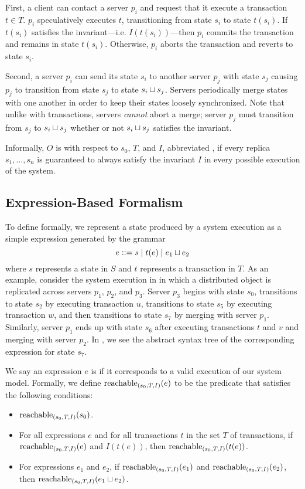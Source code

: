 First, a client can contact a server $p_i$ and request that it execute a
transaction $t \in T$. $p_i$ speculatively executes $t$, transitioning from
state $s_i$ to state $t(s_i)$. If $t(s_i)$ satisfies the invariant---i.e.
$I(t(s_i))$---then $p_i$ commits the transaction and remains in state $t(s_i)$.
Otherwise, $p_i$ aborts the transaction and reverts to state $s_i$.

Second, a server $p_i$ can send its state $s_i$ to another server $p_j$ with
state $s_j$ causing $p_j$ to transition from state $s_j$ to state $s_i \sqcup
s_j$. Servers periodically merge states with one another in order to keep their
states loosely synchronized. Note that unlike with transactions, servers
\emph{cannot} abort a merge; server $p_j$ must transition from $s_j$ to $s_i
\sqcup s_j$ whether or not $s_i \sqcup s_j$ satisfies the invariant.

Informally, $O$ is  with respect to $s_0$, $T$,
and $I$, abbreviated , if every replica $s_1, \ldots,
s_n$ is guaranteed to always satisfy the invariant $I$ in every possible
execution of the system.

\subsection{Expression-Based Formalism}
To define \invariantconfluence{} formally, we represent a state produced by a
system execution as a simple expression generated by the grammar
\[
  e ::= s \mid t(e) \mid e_1 \sqcup e_2
\]
where $s$ represents a state in $S$ and $t$ represents a transaction in $T$. As
an example, consider the system execution in  in which
a distributed object is replicated across servers $p_1$, $p_2$, and $p_3$.
Server $p_3$ begins with state $s_0$, transitions to state $s_2$ by executing
transaction $u$, transitions to state $s_5$ by executing transaction $w$, and
then transitions to state $s_7$ by merging with server $p_1$. Similarly, server
$p_1$ ends up with state $s_6$ after executing transactions $t$ and $v$ and
merging with server $p_2$. In , we see the abstract syntax
tree of the corresponding expression for state $s_7$.

{}

We say an expression $e$ is  if it corresponds to a
valid execution of our system model. Formally, we define
$\text{reachable}_{(s_0, T, I)}(e)$ to be the predicate that satisfies the
following conditions:
\pagebreak
\begin{itemize}
  \item
    $\text{reachable}_{(s_0, T, I)}(s_0)$.
  \item
    For all expressions $e$ and for all transactions $t$ in the set $T$ of
    transactions, if $\text{reachable}_{(s_0, T, I)}(e)$ and $I(t(e))$, then
    $\text{reachable}_{(s_0, T, I)}(t(e))$.
  \item
    For expressions $e_1$ and $e_2$, if $\text{reachable}_{(s_0, T, I)}(e_1)$ and
    $\text{reachable}_{(s_0, T, I)}(e_2)$, then $\text{reachable}_{(s_0, T, I)}(e_1 \sqcup
    e_2)$.
\end{itemize}

